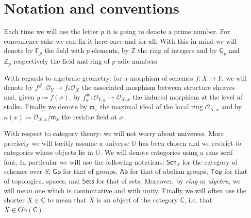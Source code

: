 \section*{Notation and conventions}
Each time we will use the letter $p$ it is going to denote a prime number.
For convenience sake we can fix it here once and for all.
With this in mind we will denote by $\mathbb{F}_{p}$ the field with $p$ elements,
by $\mathbb{Z}$ the ring of integers and by $\mathbb{Q}_p$ and $\mathbb{Z}_{p}$
respectively the field and ring of $p$-adic numbers.


With regards to algebraic geometry: for a morphism of schemes $f\colon X \to Y$,
we will denote by $f^{\#}\colon \mathcal{O}_{ Y } \to f_*\mathcal{O}_{ X }$ the
associated morphism between structure sheaves and, given $y \coloneqq f(x)$,
by $f_y^{\#}\colon \mathcal{O}_{ Y,y } \to \mathcal{O}_{ X,x }$ the induced morphism
at the level of stalks.
Finally we denote by $\mathfrak{m}_x$ the maximal ideal of the local ring
$\mathcal{O}_{ X,x }$ and by $\kappa(x) \coloneqq \mathcal{O}_{ X,x }/\mathfrak{m}_x$
the residue field at $x$.

With respect to category theory:
we will not worry about universes. More precisely we will
tacitly assume a universe $\mathbb{U}$ has been chosen
and we restrict to categories whose objects lie in $\mathbb{U}$.
We will denote categories using a sans serif font.
In particular we will use the following notations:
$\mathsf{Sch}_{S}$ for the category of schemes over $S$,
$\mathsf{Gp}$ for that of groups,
$\mathsf{Ab}$ for that of abelian groups,
$\mathsf{Top}$ for that of topological spaces,
and $\mathsf{Sets}$ for that of sets.
Moreover, by {\em ring} or {\em algebra}, we will mean one which is commutative and with unity.
Finally we will often use the shorter $X \in \mathsf{C}$ to mean that $X$ is an object
of the category $\mathsf{C}$, i.e. that $X \in \mathrm{Ob} \left(\mathsf{C}\right)$.
